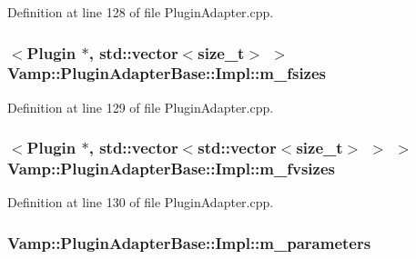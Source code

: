 Definition at line 128 of file Plugin\+Adapter.\+cpp.

\subsubsection[{\texorpdfstring{m\+\_\+fsizes}{m_fsizes}}]{$<${\bf Plugin} $\ast$, std\+::vector$<$size\+\_\+t$>$ $>$ Vamp\+::\+Plugin\+Adapter\+Base\+::\+Impl\+::m\+\_\+fsizes\hspace{0.3cm}{\ttfamily [protected]}}\hypertarget{class_vamp_1_1_plugin_adapter_base_1_1_impl_aa9fa862a49d49fae2dc4b45bc23f5281}{}\label{class_vamp_1_1_plugin_adapter_base_1_1_impl_aa9fa862a49d49fae2dc4b45bc23f5281}


Definition at line 129 of file Plugin\+Adapter.\+cpp.

\subsubsection[{\texorpdfstring{m\+\_\+fvsizes}{m_fvsizes}}]{$<${\bf Plugin} $\ast$, std\+::vector$<$std\+::vector$<$size\+\_\+t$>$ $>$ $>$ Vamp\+::\+Plugin\+Adapter\+Base\+::\+Impl\+::m\+\_\+fvsizes\hspace{0.3cm}{\ttfamily [protected]}}\hypertarget{class_vamp_1_1_plugin_adapter_base_1_1_impl_a166ff8e5df4fcd27f74bc7179e14c33e}{}\label{class_vamp_1_1_plugin_adapter_base_1_1_impl_a166ff8e5df4fcd27f74bc7179e14c33e}


Definition at line 130 of file Plugin\+Adapter.\+cpp.

\subsubsection[{\texorpdfstring{m\+\_\+parameters}{m_parameters}}]{ Vamp\+::\+Plugin\+Adapter\+Base\+::\+Impl\+::m\+\_\+parameters\hspace{0.3cm}{\ttfamily [protected]}}\hypertarget{class_vamp_1_1_plugin_adapter_base_1_1_impl_a0edebff94969c59cc651b4517bcc6bb9}{}\label{class_vamp_1_1_plugin_adapter_base_1_1_impl_a0edebff94969c59cc651b4517bcc6bb9}


